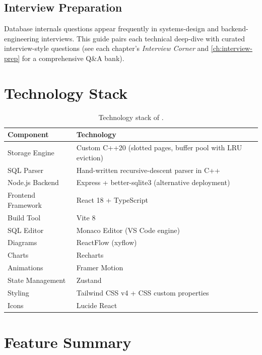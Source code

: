 \subsection{Interview Preparation}
Database internals questions appear frequently in systems-design and backend-engineering interviews.  This guide pairs each technical deep-dive with curated interview-style questions (see each chapter's \emph{Interview Corner} and \cref{ch:interview-prep} for a comprehensive Q\&A bank).

\section{Technology Stack}

\begin{table}[H]
\centering
\caption{Technology stack of \shiftdb{}.}
\label{tab:tech-stack}
\begin{tabular}{l p{12cm}}
\toprule
\textbf{Component} & \textbf{Technology} \\
\midrule
Storage Engine        & Custom C++20 (slotted pages, buffer pool with LRU eviction) \\
SQL Parser            & Hand-written recursive-descent parser in C++ \\
Node.js Backend       & Express + better-sqlite3 (alternative deployment) \\
Frontend Framework    & React 18 + TypeScript \\
Build Tool            & Vite 8 \\
SQL Editor            & Monaco Editor (VS Code engine) \\
Diagrams              & ReactFlow (xyflow) \\
Charts                & Recharts \\
Animations            & Framer Motion \\
State Management      & Zustand \\
Styling               & Tailwind CSS v4 + CSS custom properties \\
Icons                 & Lucide React \\
\bottomrule
\end{tabular}
\end{table}

\section{Feature Summary}

